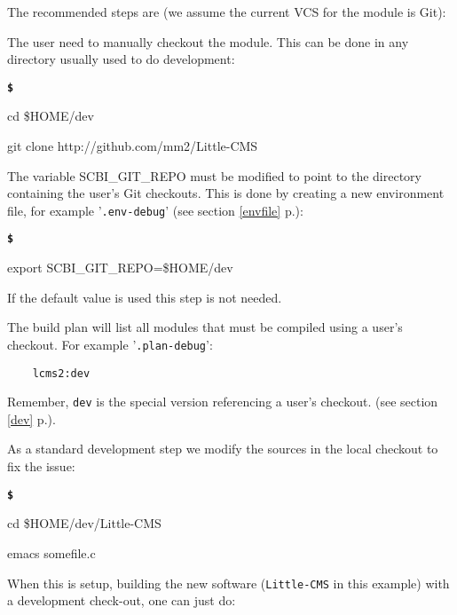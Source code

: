 \documentclass[a4paper,12pt,twoside]{article}
\newenvironment{shellcommand}{
	\begin{list}{ %
			\bfseries\texttt \$
		}{ %
			\ttfamily
			\setlength{\topsep}{-0.3ex}
			\setlength{\labelwidth}{1in}
			\setlength{\leftmargin}{0.7in}
			\setlength{\labelsep}{0.5ex}
			\setlength{\rightmargin}{0.5in}
			\setlength{\itemsep}{1ex}
			\setlength{\parsep}{0ex}
			\setlength{\listparindent}{0.5in}
		}
	}{
	\end{list}
}
\newcommand{\code}[1]{\texttt{#1}}
\newcommand{\seeref}[1]{see section \ref{#1} p.\pageref{#1}}
\newcommand{\file}[1]{'{\texttt{#1}}'}
\begin{document}
The recommended steps are (we assume the current VCS for the module is Git):

\begin{description}[style=nextline]
	\item[Checkout the module] The user need to manually checkout the module. This can be done in any directory usually used to do development:

	\begin{shellcommand}
	\item cd \$HOME/dev
	\item git clone http://github.com/mm2/Little-CMS
	\end{shellcommand}

	\item[Setup SCBI enviroment] The variable SCBI\_GIT\_REPO must be modified to point to the directory containing the user's Git checkouts. This is done by creating a new environment file, for example \file{.env-debug} (\seeref{envfile}):

	\begin{shellcommand}
	\item export SCBI\_GIT\_REPO=\$HOME/dev
	\end{shellcommand}

	If the default value is used this step is not needed.

	\item[Create a build plan] The build plan will list all modules that must be compiled using a user's checkout. For example \file{.plan-debug}:

	\begin{lstlisting}
	lcms2:dev
	\end{lstlisting}

	Remember, \code{dev} is the special version referencing a user's checkout. (\seeref{dev}).

	\item[Modify the module's sources] As a standard development step we modify the sources in the local checkout to fix the issue:

	\begin{shellcommand}
	\item cd \$HOME/dev/Little-CMS
	\item emacs somefile.c
	\end{shellcommand}

\end{description}

When this is setup, building the new software (\code{Little-CMS} in this example) with a development check-out, one can just do:
\end{document}
